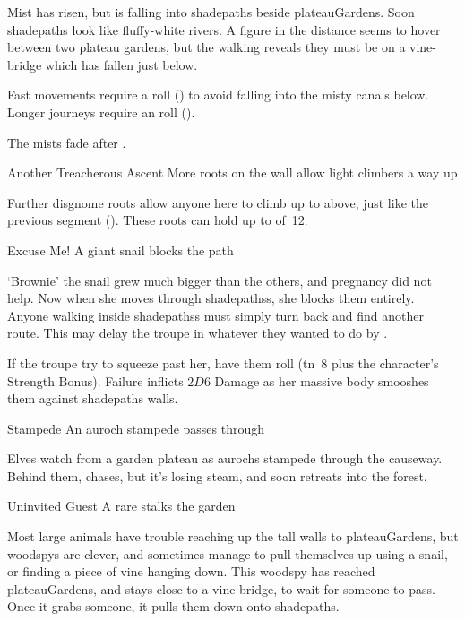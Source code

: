 \begin{boxtext}
  Mist has risen, but is falling into \gls{shadepaths} beside \gls{plateauGardens}.
  Soon \gls{shadepaths} look like fluffy-white rivers.
  A figure in the distance seems to hover between two plateau gardens, but the walking reveals they must be on a vine-bridge which has fallen just below.
\end{boxtext}

Fast movements require a  roll (\tn[8]) to avoid falling into the misty canals below.
Longer journeys require an  roll (\tn[10]).

The mists fade after .

{Another Treacherous Ascent}%
{More roots on the wall allow light climbers a way up}%

Further \gls{disgnome} roots allow anyone here to climb up to  above, just like the previous \gls{segment} ().
These roots can hold up to  of~12.


{Excuse Me!}%
{A giant snail blocks the path}%

`Brownie' the snail grew much bigger than the others, and pregnancy did not help.
Now when she moves through \glspl{shadepaths}, she blocks them entirely.
Anyone walking inside \glspl{shadepaths} must simply turn back and find another route.
This may delay the troupe in whatever they wanted to do by .

If the troupe try to squeeze past her, have them roll  (\gls{tn}~8 plus the character's Strength Bonus).
Failure inflicts $2D6$ Damage as her massive body smooshes them against \gls{shadepaths} walls.

{Stampede}%
{An auroch stampede passes through}%

\label{sunwayEarthIngredients}
Elves watch from a garden plateau as aurochs stampede through the causeway.
Behind them,  chases, but it's losing steam, and soon retreats into the forest.

{Uninvited Guest}%
{A rare  stalks the garden}%

\label{plateauWaterIngredient}
Most large animals have trouble reaching up the tall walls to \gls{plateauGardens}, but \glspl{woodspy} are clever, and sometimes manage to pull themselves up using a snail, or finding a piece of vine hanging down.
This \gls{woodspy} has reached \gls{plateauGardens}, and stays close to a vine-bridge, to wait for someone to pass.
Once it grabs someone, it pulls them down onto \gls{shadepaths}.

